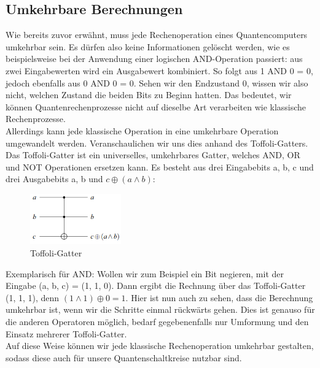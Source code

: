 \subsection{Umkehrbare Berechnungen}
\label{subsec:umkehrbare-berechnungen}

Wie bereits zuvor erwähnt, muss jede Rechenoperation eines Quantencomputers umkehrbar sein.
Es dürfen also keine Informationen gelöscht werden, wie es beispielsweise bei der Anwendung einer logischen AND-Operation passiert: aus zwei Eingabewerten wird ein Ausgabewert kombiniert.
So folgt aus 1 AND 0 = 0, jedoch ebenfalls aus 0 AND 0 = 0.
Sehen wir den Endzustand 0, wissen wir also nicht, welchen Zustand die beiden Bits zu Beginn hatten.
Das bedeutet, wir können Quantenrechenprozesse nicht auf dieselbe Art verarbeiten wie klassische Rechenprozesse.\\

Allerdings kann jede klassische Operation in eine umkehrbare Operation umgewandelt werden.
Veranschaulichen wir uns dies anhand des Toffoli-Gatters.\\

Das Toffoli-Gatter ist ein universelles, umkehrbares Gatter, welches AND, OR und NOT Operationen ersetzen kann.
Es besteht aus drei Eingabebits a, b, c und drei Ausgabebits a, b und $c\oplus(a\land b)$:\\
\begin{figure}[H]
    \centering
    \includegraphics[width=0.35\textwidth]{img/Umkehrbare_Berechnungen Toffoli}
    \caption{Toffoli-Gatter}
    \label{fig:toffoli-gatter}
\end{figure}

Exemplarisch für AND: Wollen wir zum Beispiel ein Bit negieren, mit der Eingabe (a, b, c) = (1, 1, 0).
Dann ergibt die Rechnung über das Toffoli-Gatter (1, 1, 1), denn $(1\land 1) \oplus 0 = 1$.
Hier ist nun auch zu sehen, dass die Berechnung umkehrbar ist, wenn wir die Schritte einmal rückwärts gehen.
Dies ist genauso für die anderen Operatoren möglich, bedarf gegebenenfalls nur Umformung und den Einsatz mehrerer Toffoli-Gatter.\\

Auf diese Weise können wir jede klassische Rechenoperation umkehrbar gestalten, sodass diese auch für unsere Quantenschaltkreise nutzbar sind.\\


